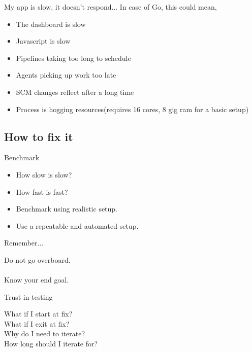 \documentclass{beamer}
\begin{document}
\begin{frame}{My app is slow, it doesn't respond...}
  In case of Go, this could mean,
  \begin{itemize}
  \item The dashboard is slow
    \pause
  \item Javascript is slow
    \pause
  \item Pipelines taking too long to schedule
    \pause
  \item Agents picking up work too late
    \pause
  \item SCM changes reflect after a long time
    \pause
  \item Process is hogging resources(requires 16 cores, 8 gig ram for a basic setup)
  \end{itemize}
\end{frame}

\subsection{How to fix it}

\begin{frame}{Benchmark}
  \begin{itemize}
  \item How slow is slow?
    \pause
  \item How fast is fast?
    \pause
  \item Benchmark using realistic setup.
    \pause
  \item Use a repeatable and automated setup.
  \end{itemize}
\end{frame}

\begin{frame}{Remember...}
  \begin{center}
    \large{Do not go overboard.}\quad\\
    \quad\\
    \small{Know your end goal.}
  \end{center}
\end{frame}

\begin{frame}{Trust in testing}
  \begin{center}
  \end{center}
  \begin{center}
    What if I start at fix? \quad\\
    \pause
    What if I exit at fix? \quad\\
    \pause
    Why do I need to iterate? \quad\\
    \pause
    How long should I iterate for? \quad\\
  \end{center}
\end{frame}
\end{document}
